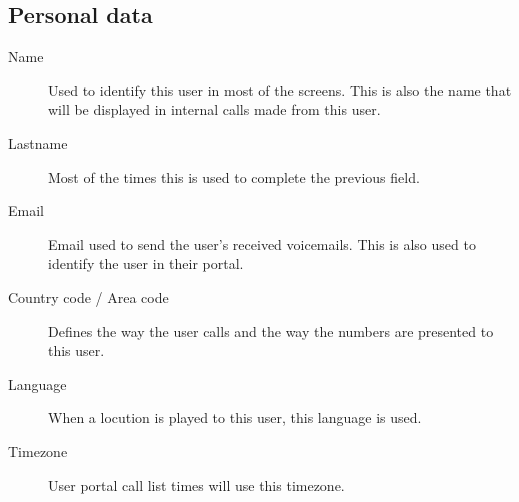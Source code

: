 \documentclass[letterpaper,10pt,english]{sphinxmanual}
\begin{document}
\subsection{Personal data}
\label{pbx_features/users:personal-data}
\noindent{}
\begin{description}
\item[{Name}] \leavevmode{}\label{pbx_features/users:term-name}
Used to identify this user in most of the screens. This is also the
name that will be displayed in internal calls made from this user.

\item[{Lastname}] \leavevmode{}\label{pbx_features/users:term-lastname}
Most of the times this is used to complete the previous field.

\item[{Email}] \leavevmode{}\label{pbx_features/users:term-email}
Email used to send the user's received voicemails. This is also used to
identify the user in their portal.

\item[{Country code / Area code}] \leavevmode{}\label{pbx_features/users:term-country-code-area-code}
Defines the way the user calls and the way the numbers are presented to
this user.

\item[{Language}] \leavevmode{}\label{pbx_features/users:term-language}
When a locution is played to this user, this language is used.

\item[{Timezone}] \leavevmode{}\label{pbx_features/users:term-timezone}
User portal call list times will use this timezone.

\end{description}
\end{document}
